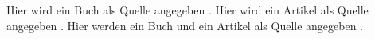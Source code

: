 \documentclass[12pt,a5paper]{article}
\begin{document}
Hier wird ein Buch als Quelle angegeben \parencite[2]{Oechsner.2015}. 
Hier wird ein Artikel als Quelle angegeben \parencite{Muster.2020}. 
Hier werden ein Buch und ein Artikel als Quelle angegeben \parencite{Oechsner.2015, Muster.2020}. 
\printbibliography
\end{document}
